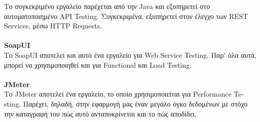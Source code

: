 Το συγκεκριμένο εργαλείο παρέχεται από την \textlatin{Java} και εξυπηρετεί στο αυτοματοποιημένο \textlatin{API Testing}. Συγκεκριμένα, εξυπηρετεί στον έλεγχο των \textlatin{REST Services}, μέσω \textlatin{HTTP Requests}.\\ \\ 
\textbf{\textlatin{SoapUI}}\\
Το \textlatin{SoapUI} αποτελεί και αυτό ένα εργαλείο για \textlatin{Web Service Testing}. Παρ' όλα αυτά, μπορεί να χρησιμοποιηθεί και για \textlatin{Functional} και \textlatin{Load Testing}.\\ \\
\textbf{\textlatin{JMeter}}\\
Το \textlatin{JMeter} αποτελεί ένα εργαλείο, το οποίο χρησιμοποιείται για \textlatin{Performance Testing}. Παρέχει, δηλαδή, στην εφαρμογή μας έναν μεγάλο όγκο δεδομένων με στόχο την καταγραφή του πώς αυτό ανταποκρίνεται και το πώς αποδίδει.\\ \\
